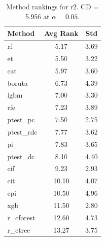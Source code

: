 \begin{table}[h]
\centering
\caption{Method rankings for r2. CD = 5.956 at $\alpha=0.05$.}
\label{tab:ranks_r2}
\begin{tabular}{lcc}
\toprule
Method & Avg Rank & Std \\
\midrule
rf & 5.17 & 3.69 \\
et & 5.50 & 3.22 \\
cat & 5.97 & 3.60 \\
boruta & 6.73 & 4.39 \\
lgbm & 7.00 & 3.30 \\
rfe & 7.23 & 3.89 \\
ptest_pc & 7.50 & 2.75 \\
ptest_rdc & 7.77 & 3.62 \\
pi & 7.83 & 3.65 \\
ptest_dc & 8.10 & 4.40 \\
cif & 9.23 & 2.93 \\
cit & 10.10 & 4.07 \\
cpi & 10.50 & 4.96 \\
xgb & 11.50 & 2.80 \\
r_cforest & 12.60 & 4.73 \\
r_ctree & 13.27 & 3.75 \\
\bottomrule
\end{tabular}
\end{table}